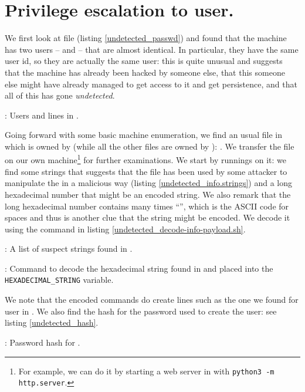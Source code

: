 \section{Privilege escalation to user.}
\par We first look at file  (listing \ref{undetected_passwd}) and found that the machine has two users --  and  -- that are almost identical. In particular, they have the same user id, so they are actually the same user: this is quite unusual and suggests that the machine has already been hacked by someone else, that this someone else might have already managed to get access to it and get persistence, and that all of this has gone \emph{undetected}.
\begin{listing}
  
  \caption{: Users and  lines in .}
  \label{undetected_passwd}
\end{listing}
\par Going forward with some basic machine enumeration, we find an usual file in  which is owned by  (while all the other files are owned by ): . We transfer the file on our own machine\footnote{For example, we can do it by starting a web server in  with \texttt{python3 -m http.server}.} for further examinations. We start by runnings  on it: we find some strings that suggests that the file has been used by some attacker to manipulate the  in a malicious way (listing \ref{undetected_info.strings}) and a long hexadecimal number that might be an encoded string. We also remark that the long hexadecimal number contains many times ``'', which is the ASCII code for spaces and thus is another clue that the string might be encoded. We decode it using the command in listing \ref{undetected_decode-info-payload.sh}.
\begin{listing}
  
  \caption{: A list of suspect strings found in .}
  \label{undetected_info.strings}
\end{listing}
\begin{listing}
  \tiny
  \caption{: Command to decode the hexadecimal string found in  and placed into the \texttt{HEXADECIMAL_STRING} variable.}
  \label{undetected_decode-info-payload.sh}
\end{listing}
\par We note that the encoded commands do create lines such as the one we found for user  in . We also find the hash for the password used to create the user: see listing \ref{undetected_hash}.
\begin{listing}
  \tiny
  
  \caption{: Password hash for .}
  \label{undetected_hash}
\end{listing}
